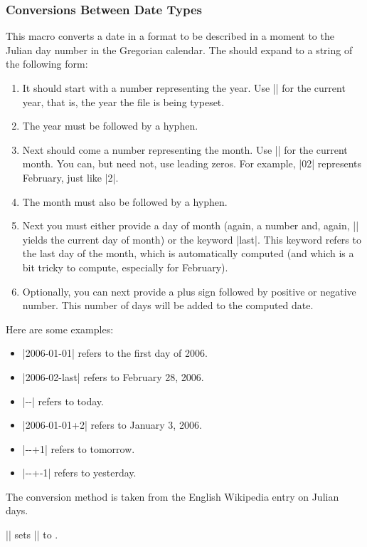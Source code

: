 \subsubsection{Conversions Between Date Types}

\begin{command}{\pgfcalendardatetojulian{}}
    This macro converts a date in a format to be described in a moment to the
    Julian day number in the Gregorian calendar. The  should expand
    to a string of the following form:
    \begin{enumerate}
    \label{calendar-date-format}
        \item It should start with a number representing the year. Use |\year|
            for the current year, that is, the year the file is being typeset.
        \item The year must be followed by a hyphen.
        \item Next should come a number representing the month. Use |\month|
            for the current month. You can, but need not, use leading zeros.
            For example, |02| represents February, just like |2|.
        \item The month must also be followed by a hyphen.
        \item Next you must either provide a day of month (again, a number and,
            again, |\day| yields the current day of month) or the keyword
            |last|. This keyword refers to the last day of the month, which is
            automatically computed (and which is a bit tricky to compute,
            especially for February).
        \item Optionally, you can next provide a plus sign followed by positive
            or negative number. This number of days will be added to the
            computed date.
    \end{enumerate}

    Here are some examples:
    \begin{itemize}
        \item |2006-01-01| refers to the first day of 2006.
        \item |2006-02-last| refers to February 28, 2006.
        \item |\year-\month-\day| refers to today.
        \item |2006-01-01+2| refers to January 3, 2006.
        \item |\year-\month-\day+1| refers to tomorrow.
        \item |\year-\month-\day+-1| refers to yesterday.
    \end{itemize}

    The conversion method is taken from the English Wikipedia entry on Julian
    days.

    \newcount\mycount
    \example || sets
    |\mycount| to
    \the\mycount.
\end{command}


